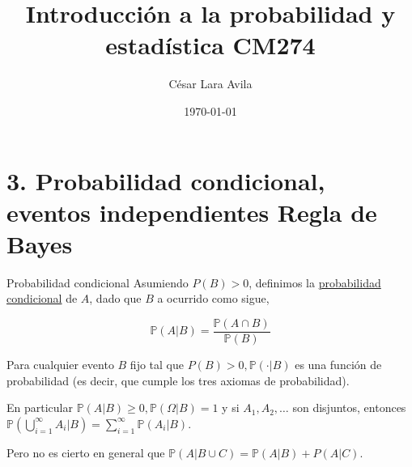 \documentclass[10pt]{beamer}
\title{Introducci\'on a la probabilidad y estad\'istica CM274}
\date{\today}
\author{C\'esar Lara Avila}
\institute{\url{https://github.com/C-Lara}}
\begin{document}
  \maketitle
  \section{3. Probabilidad condicional, eventos independientes
  	Regla de Bayes}
  
  
  \begin{frame}{Probabilidad condicional }
Asumiendo $P(B) > 0$, definimos la \underline{probabilidad condicional} de $A$, dado que $B$ a ocurrido como sigue, 

\[
\mathbb{P}(A|B ) = \frac{\mathbb{P}(A \cap B)}{\mathbb{P}(B)}
\]



Para cualquier evento $B$ fijo  tal que  $P (B)> 0, \mathbb{P} (\cdot| B)$ es una funci\'on de  probabilidad (es decir, que cumple los tres axiomas de probabilidad). 

En particular $\mathbb{P}(A|B) \geq 0, \mathbb{P}(\Omega|B) = 1$ y si $A_1,A_2, \dots $ son disjuntos, entonces $\mathbb{P}(\bigcup\limits_{i= 1}^{\infty}A_i|B)= \sum_{i = 1}^{\infty}\mathbb{P}(A_i|B)$. 

Pero no es cierto en general que $\mathbb{P}(A|B \cup C) = \mathbb{P}(A|B) + P(A|C)$.

\end{frame}
\end{document}
